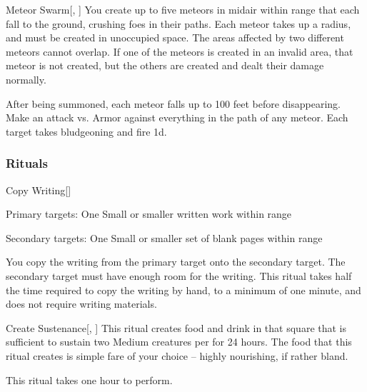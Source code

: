 \lowercase{\hypertarget{spell:Meteor Swarm}{}}\label{spell:Meteor Swarm}
\begin{freeability}[Rank 8]{\hypertarget{spell:Meteor Swarm}{Meteor Swarm}}[, ]
You create up to five meteors in midair within \rnglong range that each fall to the ground, crushing foes in their paths.
Each meteor takes up a \areasmall radius, and must be created in unoccupied space.
The areas affected by two different meteors cannot overlap.
If one of the meteors is created in an invalid area, that meteor is not created, but the others are created and dealt their damage normally.

After being summoned, each meteor falls up to 100 feet before disappearing.
Make an attack vs. Armor against everything in the path of any meteor.
\hit Each target takes bludgeoning and fire  \minus1d.
\end{freeability}
\vspace{0.25em}



\subsubsection{Rituals}


\lowercase{\hypertarget{spell:Copy Writing}{}}\label{spell:Copy Writing}
\begin{freeability}[Rank 1]{\hypertarget{spell:Copy Writing}{Copy Writing}}[]

Primary targets: One Small or smaller written work within \rngclose range
\par\noindent
Secondary targets: One Small or smaller set of blank pages within \rngclose range

You copy the writing from the primary target onto the secondary target.
The secondary target must have enough room for the writing.
This ritual takes half the time required to copy the writing by hand, to a minimum of one minute, and does not require writing materials.
\end{freeability}
\vspace{0.25em}



\lowercase{\hypertarget{spell:Create Sustenance}{}}\label{spell:Create Sustenance}
\begin{apability}[Rank 3]{\hypertarget{spell:Create Sustenance}{Create Sustenance}}[, ]
This ritual creates food and drink in that square that is sufficient to sustain two Medium creatures per  for 24 hours.
The food that this ritual creates is simple fare of your choice -- highly nourishing, if rather bland.

This ritual takes one hour to perform.
\end{apability}
\vspace{0.25em}



